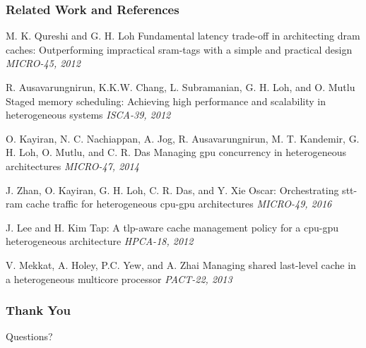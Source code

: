 \documentclass{beamer}
\begin{document}

\begin{frame}
\frametitle{Related Work and References}
\scriptsize{
\begin{thebibliography}{99} %
 M. K. Qureshi and G. H. Loh
\newblock Fundamental latency trade-off in architecting dram caches: Outperforming impractical sram-tags with a simple and practical design
\newblock \emph{MICRO-45, 2012}


 R. Ausavarungnirun, K.K.W. Chang, L. Subramanian, G. H. Loh, and O. Mutlu
\newblock Staged memory scheduling: Achieving high performance and scalability in heterogeneous systems
\newblock \emph{ISCA-39, 2012}

 O. Kayiran, N. C. Nachiappan, A. Jog, R. Ausavarungnirun, M. T. Kandemir, G. H. Loh, O. Mutlu, and C. R. Das
\newblock Managing gpu concurrency in heterogeneous architectures
\newblock \emph{MICRO-47, 2014}

 J. Zhan, O. Kayiran, G. H. Loh, C. R. Das, and Y. Xie
\newblock Oscar: Orchestrating stt-ram cache traffic for heterogeneous cpu-gpu architectures
\newblock \emph{MICRO-49, 2016}

 J. Lee and H. Kim
\newblock Tap: A tlp-aware cache management policy for a cpu-gpu heterogeneous architecture
\newblock \emph{HPCA-18, 2012}

 V. Mekkat, A. Holey, P.C. Yew, and A. Zhai
\newblock Managing shared last-level cache in a heterogeneous multicore processor
\newblock \emph{PACT-22, 2013}

\end{thebibliography}
}
\end{frame}


\begin{frame}
\frametitle{Thank You}
\Huge{\centerline{Questions? }}
\end{frame}

\end{document}
